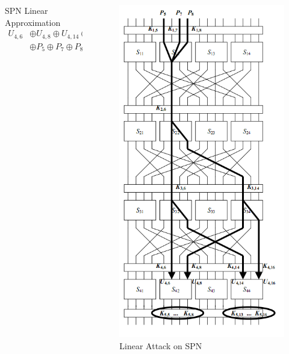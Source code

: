 \documentclass[9pt]{beamer}
\begin{document}
\begin{frame}
\begin{columns}
\begin{column}{0.45\textwidth}
\begin{block}{SPN Linear Approximation}
\begin{align*}
 U_{4,6} & \oplus U_{4,8} \oplus U_{4,14} \oplus U_{4, 16} \\
         & \oplus P_5 \oplus P_7 \oplus P_8 = 0 
\end{align*}
\end{block}
\end{column}
\begin{column}{0.55\textwidth}
\begin{figure}
\includegraphics[totalheight=0.85\textheight]{SPN_linear.PNG}
\caption{Linear Attack on SPN}
\end{figure}
\end{column}
\end{columns}
\end{frame}
\end{document}
